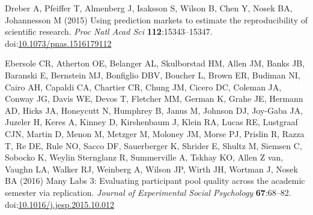 \documentclass[
  english,
  a4paper,
]{article}
\newlength{\cslhangindent}
\newlength{\cslentryspacingunit} %
\newenvironment{CSLReferences}[2] %
 {%
  \setlength{\parindent}{0pt}
  \ifodd #1
  \let\oldpar\par
  \def\par{\hangindent=\cslhangindent\oldpar}
  \fi
  \setlength{\parskip}{#2\cslentryspacingunit}
 }%
 {}
\begin{document}
\begin{CSLReferences}{1}{0}
\leavevmode{}%
Dreber A, Pfeiffer T, Almenberg J, Isaksson S, Wilson B, Chen Y, Nosek BA, Johannesson M (2015) Using prediction markets to estimate the reproducibility of scientific research. \emph{Proc Natl Acad Sci} \textbf{112}:15343--15347. doi:\href{https://doi.org/10.1073/pnas.1516179112}{10.1073/pnas.1516179112}

\leavevmode{}%
Ebersole CR, Atherton OE, Belanger AL, Skulborstad HM, Allen JM, Banks JB, Baranski E, Bernstein MJ, Bonfiglio DBV, Boucher L, Brown ER, Budiman NI, Cairo AH, Capaldi CA, Chartier CR, Chung JM, Cicero DC, Coleman JA, Conway JG, Davis WE, Devos T, Fletcher MM, German K, Grahe JE, Hermann AD, Hicks JA, Honeycutt N, Humphrey B, Janus M, Johnson DJ, Joy-Gaba JA, Juzeler H, Keres A, Kinney D, Kirshenbaum J, Klein RA, Lucas RE, Lustgraaf CJN, Martin D, Menon M, Metzger M, Moloney JM, Morse PJ, Prislin R, Razza T, Re DE, Rule NO, Sacco DF, Sauerberger K, Shrider E, Shultz M, Siemsen C, Sobocko K, Weylin Sternglanz R, Summerville A, Tskhay KO, Allen Z van, Vaughn LA, Walker RJ, Weinberg A, Wilson JP, Wirth JH, Wortman J, Nosek BA (2016) Many {Labs} 3: {Evaluating} participant pool quality across the academic semester via replication. \emph{Journal of Experimental Social Psychology} \textbf{67}:68--82. doi:\href{https://doi.org/10.1016/j.jesp.2015.10.012}{10.1016/j.jesp.2015.10.012}


\end{CSLReferences}
\end{document}
